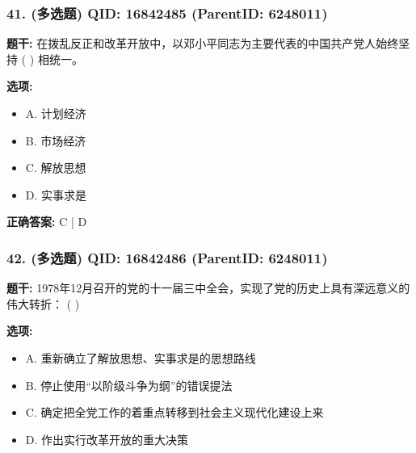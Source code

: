 \documentclass[12pt,UTF8]{ctexart}
\begin{document}
\vspace{0.3em}\hrulefill\vspace{0.7em}

\subsubsection*{41. (多选题) \small QID: 16842485 (ParentID: 6248011)}

\textbf{题干:}
在拨乱反正和改革开放中，以邓小平同志为主要代表的中国共产党人始终坚持 ( ) 相统一。



\textbf{选项:}
\begin{itemize}[leftmargin=*]

  \item A. 计划经济

  \item B. 市场经济

  \item C. 解放思想

  \item D. 实事求是

\end{itemize}

\textbf{正确答案:}
C | D

\vspace{0.3em}\hrulefill\vspace{0.7em}

\subsubsection*{42. (多选题) \small QID: 16842486 (ParentID: 6248011)}

\textbf{题干:}
1978年12月召开的党的十一届三中全会，实现了党的历史上具有深远意义的伟大转折： ( )



\textbf{选项:}
\begin{itemize}[leftmargin=*]

  \item A. 重新确立了解放思想、实事求是的思想路线

  \item B. 停止使用“以阶级斗争为纲”的错误提法

  \item C. 确定把全党工作的着重点转移到社会主义现代化建设上来

  \item D. 作出实行改革开放的重大决策

\end{itemize}
\end{document}
